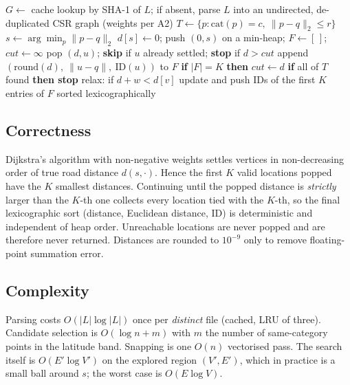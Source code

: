 \documentclass[11pt,a4paper]{article}
\begin{document}
\begin{algorithm}[h]
\caption{\textsc{Search}$(q,\;c,\;r,\;L)$ \quad ($K=10$)}
\begin{algorithmic}[1]
\State $G \gets$ cache lookup by SHA-1 of $L$; if absent, parse $L$ into an undirected, de-duplicated CSR graph (weights per A2)
\State $T \gets \{p : \mathrm{cat}(p)=c,\ \lVert p-q\rVert_2 \le r\}$ 
\State $s \gets \arg\min_p \lVert p-q\rVert_2$ 
\State $d[s]\gets 0$; push $(0,s)$ on a min-heap; $F\gets[\,]$; $\textit{cut}\gets\infty$
  \State pop $(d,u)$; \textbf{skip} if $u$ already settled; \textbf{stop} if $d>\textit{cut}$
     \State append $(\mathrm{round}(d),\ \lVert u-q\rVert,\ \mathrm{ID}(u))$ to $F$
     \State \textbf{if} $|F|=K$ \textbf{then} $\textit{cut}\gets d$ \quad\textbf{if} all of $T$ found \textbf{then stop}
  \EndIf
   relax: if $d+w<d[v]$ update and push \EndFor
\EndWhile
\State \Return IDs of the first $K$ entries of $F$ sorted lexicographically
\end{algorithmic}
\end{algorithm}

\subsection{Correctness}
Dijkstra's algorithm with non-negative weights settles vertices in non-decreasing order of true road distance $d(s,\cdot)$.
Hence the first $K$ valid locations popped have the $K$ smallest distances. Continuing until the popped distance is
\emph{strictly} larger than the $K$-th one collects every location tied with the $K$-th, so the final lexicographic sort
(distance, Euclidean distance, ID) is deterministic and independent of heap order. Unreachable locations are never popped and
are therefore never returned. Distances are rounded to $10^{-9}$ only to remove floating-point summation error.

\subsection{Complexity}
Parsing costs $O(|L|\log|L|)$ once per \emph{distinct} file (cached, LRU of three). Candidate selection is $O(\log n+m)$ with $m$
the number of same-category points in the latitude band. Snapping is one $O(n)$ vectorised pass. The search itself is
$O(E'\log V')$ on the explored region $(V',E')$, which in practice is a small ball around $s$; the worst case is $O(E\log V)$.
\end{document}
